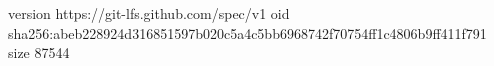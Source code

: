 version https://git-lfs.github.com/spec/v1
oid sha256:abeb228924d316851597b020c5a4c5bb6968742f70754ff1c4806b9ff411f791
size 87544
